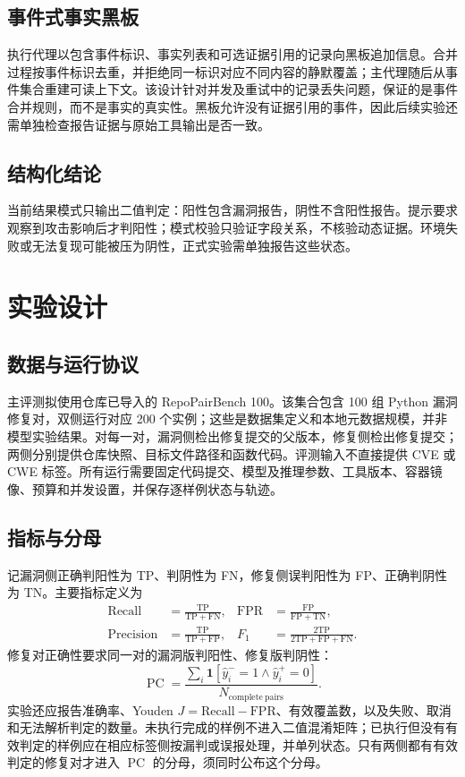 \documentclass[times,twoside,watermark]{zHenriquesLab-StyleBioRxiv}
\newcommand{\PC}{\operatorname{PC}}
\begin{document}
\subsection*{事件式事实黑板}
执行代理以包含事件标识、事实列表和可选证据引用的记录向黑板追加信息。合并过程按事件标识去重，并拒绝同一标识对应不同内容的静默覆盖；主代理随后从事件集合重建可读上下文。该设计针对并发及重试中的记录丢失问题，保证的是事件合并规则，而不是事实的真实性。黑板允许没有证据引用的事件，因此后续实验还需单独检查报告证据与原始工具输出是否一致。

\subsection*{结构化结论}
当前结果模式只输出二值判定：阳性包含漏洞报告，阴性不含阳性报告。提示要求观察到攻击影响后才判阳性；模式校验只验证字段关系，不核验动态证据。环境失败或无法复现可能被压为阴性，正式实验需单独报告这些状态。

\section*{实验设计}
\subsection*{数据与运行协议}
主评测拟使用仓库已导入的 RepoPairBench 100。该集合包含 100 组 Python 漏洞修复对，双侧运行对应 200 个实例；这些是数据集定义和本地元数据规模，并非模型实验结果。对每一对，漏洞侧检出修复提交的父版本，修复侧检出修复提交；两侧分别提供仓库快照、目标文件路径和函数代码。评测输入不直接提供 CVE 或 CWE 标签。所有运行需要固定代码提交、模型及推理参数、工具版本、容器镜像、预算和并发设置，并保存逐样例状态与轨迹。



\subsection*{指标与分母}
记漏洞侧正确判阳性为 TP、判阴性为 FN，修复侧误判阳性为 FP、正确判阴性为 TN。主要指标定义为
\begin{align}
\mathrm{Recall}&=\frac{\mathrm{TP}}{\mathrm{TP}+\mathrm{FN}},&
\mathrm{FPR}&=\frac{\mathrm{FP}}{\mathrm{FP}+\mathrm{TN}},\\
\mathrm{Precision}&=\frac{\mathrm{TP}}{\mathrm{TP}+\mathrm{FP}},&
F_1&=\frac{2\mathrm{TP}}{2\mathrm{TP}+\mathrm{FP}+\mathrm{FN}}.
\end{align}
修复对正确性要求同一对的漏洞版判阳性、修复版判阴性：
\begin{equation}
\PC=\frac{\sum_i\mathbf{1}[\hat y_i^{-}=1\land\hat y_i^{+}=0]}
{N_{\mathrm{complete\ pairs}}}.
\end{equation}
实验还应报告准确率、Youden $J=\mathrm{Recall}-\mathrm{FPR}$、有效覆盖数，以及失败、取消和无法解析判定的数量。未执行完成的样例不进入二值混淆矩阵；已执行但没有有效判定的样例应在相应标签侧按漏判或误报处理，并单列状态。只有两侧都有有效判定的修复对才进入 $\PC$ 的分母，须同时公布这个分母。
\end{document}

